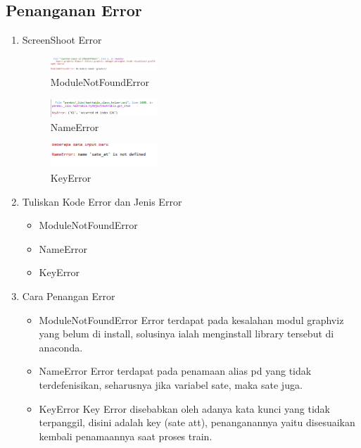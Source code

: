 \subsection{Penanganan Error}
\begin{enumerate}
	\item ScreenShoot Error
	\begin{figure}[H]
		\includegraphics[width=4cm]{figures/1174095/tugas2/error/1.PNG}
		\centering
		\caption{ModuleNotFoundError}
	\end{figure}
	\begin{figure}[H]
		\includegraphics[width=4cm]{figures/1174095/tugas2/error/2.PNG}
		\centering
		\caption{NameError}
	\end{figure}
	\begin{figure}[H]
		\includegraphics[width=4cm]{figures/1174095/tugas2/error/3.PNG}
		\centering
		\caption{KeyError}
	\end{figure}
	\item Tuliskan Kode Error dan Jenis Error
	\begin{itemize}
		\item ModuleNotFoundError
		\item NameError
		\item KeyError
	\end{itemize}
	\item Cara Penangan Error
	\begin{itemize}
		\item ModuleNotFoundError
		\hfill\break
		Error terdapat pada kesalahan modul graphviz yang belum di install, solusinya ialah menginstall library tersebut di anaconda.
		\item NameError
		\hfill\break
		Error terdapat pada penamaan alias pd yang tidak terdefenisikan, seharusnya jika variabel sate, maka sate juga.
		
		\item KeyError
		\hfill\break
		Key Error disebabkan oleh adanya kata kunci yang tidak terpanggil, disini adalah key (sate att), penanganannya yaitu disesuaikan kembali penamaannya saat proses train.
	\end{itemize}
\end{enumerate}
